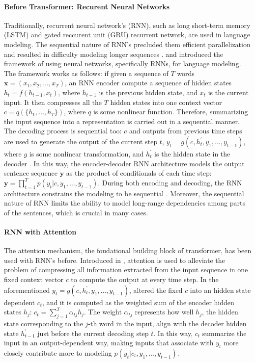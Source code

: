 \paragraph{Before Transformer: Recurent Neural Networks}
Traditionally, recurrent neural network's (RNN), such as long short-term memory (LSTM) and gated reccurent unit (GRU) recurrent network, are used in language modeling.
The sequential nature of RNN's precluded them efficient parallelization and resulted in difficulty modeling longer sequences \citep{attentionAllYouNeed}. 
\citet{encoderDecoderRNN} and \citet{encoderDecoderRNN2} introduced the framework of using neural networks, specifically 
RNNs, for language modeling. The framework works as follows:  
if given a sequence of $T$ words $\mathbf{x} =  (x_1,x_2,\dots, x_{T})$, an RNN encoder compute a sequence of hidden states $h_t = f(h_{t-1}, x_t)$, where $h_{t-1}$ is the previous hidden state, and $x_t$ is the current input. It then compresses all the $T$ hidden states into one context vector $c = q(\{h_1,\dots,h_T\})$, where $q$ is some nonlinear function. Therefore, summarizing the input sequence into a representation is carried out in a sequential manner.  
The decoding process is sequential too: $c$ and outputs from previous time steps are used to generate the output of the current step $t$, $y_t = g(c, h_t^{'}, y_1,\dots,y_{t-1})$, where $g$ is some nonlinear transformation, and $h_t^{'}$ is the hidden state in the decoder \citep{encoderDecoderRNN,encoderDecoderRNN2}.
In this way, the encoder-decoder RNN architecture models the output sentence sequence $\mathbf{y}$ as the product of conditionals of each time step: $\mathbf{y} = \prod_{t=1}^T p(y_t | c,y_1,\dots,y_{t-1})$.  
During both encoding and decoding, the RNN architecture constrains the modeling to be sequential \citep{attentionRNN}. Moreover, the sequential nature of RNN limits the ability to model long-range dependencies among parts of the sentences, which is crucial in many cases. 

\paragraph{RNN with Attention}
The attention mechanism, the foudational building block of transformer, has been used with RNN's before. 
Introduced in \citet{attentionRNN}, attention is used to alleviate the problem of compressing all information extracted from the input sequence in one fixed context vector $c$ to compute the output at every time step. In the aforementioned 
$y_t = g(c, h_t^{'}, y_1,\dots,y_{t-1})$, \citet{attentionRNN} altered the fixed $c$ into an hidden state dependent $c_t$, and it is computed as the weighted sum of the encoder hidden states $h_j$: $c_t = \sum_{j=1}^{T} \alpha_{tj} h_j$. The weight $\alpha_{tj}$ represents how well $h_j$, the hidden state corresponding to the $j$-th word in the input, align with the decoder hidden state $h_{t-1}^{'}$ just before the current decoding step $t$. In this way, $c_t$ summarize the input in an output-dependent way, making inputs that associate with $y_t$ more closely contribute more to modeling $ p(y_t | c_t,y_1,\dots,y_{t-1})$. 